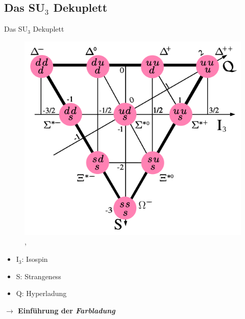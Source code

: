 \documentclass[aspectratio=169]{beamer} %
\begin{document}
    \subsection{Das SU$_3$ Dekuplett}
    \begin{frame}{Das SU\(_3\) Dekuplett}
        \begin{minipage}{0.6\textwidth}
          \begin{figure}
            \centering
          \includegraphics[width=\linewidth, keepaspectratio, height=0.8\textheight]{538px-Baryon-decuplet-small.svg.png}
          \tiny \\, 
      \end{figure}
        \end{minipage}
        \hfill
        \begin{minipage}{0.38\textwidth}
          \begin{itemize}
            \item I$_3$: Isospin
            \item S: Strangeness
            \item Q: Hyperladung %
          \end{itemize}
          \vspace*{2cm}
          \normalsize{\textbf{{$\rightarrow$ Einführung der \emph{Farbladung}}}}\vspace*{1cm}
        \end{minipage}
    \end{frame}
    
\end{document}
